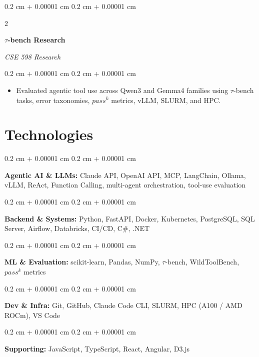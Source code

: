 \documentclass[10pt, letterpaper]{article}
\newenvironment{highlights}{
    \begin{itemize}[
        topsep=0.10 cm,
        parsep=0.10 cm,
        partopsep=0pt,
        itemsep=0pt,
        leftmargin=0.4 cm + 10pt
    ]
}{
    \end{itemize}
} %
\newenvironment{onecolentry}{
    \begin{adjustwidth}{
        0.2 cm + 0.00001 cm
    }{
        0.2 cm + 0.00001 cm
    }
}{
    \end{adjustwidth}
} %
\newenvironment{twocolentry}[2][]{
    \onecolentry
    \def\secondColumn{#2}
    \setcolumnwidth{\fill, 4.5 cm}
    \begin{paracol}{2}
}{
    \switchcolumn \raggedleft \secondColumn
    \end{paracol}
    \endonecolentry
} %
\begin{document}
        \vspace{0.2 cm}

        \begin{twocolentry}{
        \textit{CSE 598 Research}}
            \textbf{$\tau$-bench Research}
        \end{twocolentry}
        \vspace{0.10 cm}
        \begin{onecolentry}
            \begin{highlights}
                \item Evaluated agentic tool use across Qwen3 and Gemma4 families using $\tau$-bench tasks, error taxonomies, $pass^k$ metrics, vLLM, SLURM, and HPC.
            \end{highlights}
        \end{onecolentry}

    \section{Technologies}

        \begin{onecolentry}
            \textbf{Agentic AI \& LLMs:} Claude API, OpenAI API, MCP, LangChain, Ollama, vLLM, ReAct, Function Calling, multi-agent orchestration, tool-use evaluation
        \end{onecolentry}

        \vspace{0.2 cm}

        \begin{onecolentry}
            \textbf{Backend \& Systems:} Python, FastAPI, Docker, Kubernetes, PostgreSQL, SQL Server, Airflow, Databricks, CI/CD, C\#, .NET
        \end{onecolentry}

        \vspace{0.2 cm}

        \begin{onecolentry}
            \textbf{ML \& Evaluation:} scikit-learn, Pandas, NumPy, $\tau$-bench, WildToolBench, $pass^k$ metrics
        \end{onecolentry}

        \vspace{0.2 cm}

        \begin{onecolentry}
            \textbf{Dev \& Infra:} Git, GitHub, Claude Code CLI, SLURM, HPC (A100 / AMD ROCm), VS Code
        \end{onecolentry}

        \vspace{0.2 cm}

        \begin{onecolentry}
            \textbf{Supporting:} JavaScript, TypeScript, React, Angular, D3.js
        \end{onecolentry}
\end{document}
